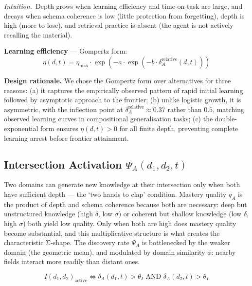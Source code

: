 \documentclass[10pt]{article}
\begin{document}
\noindent\textit{Intuition.}\ Depth grows when
learning efficiency and time-on-task are large, and decays when schema
coherence is low (little protection from forgetting), depth is high
(more to lose), and retrieval practice is absent (the agent is not
actively recalling the material).

\textbf{Learning efficiency} --- Gompertz form:
\begin{equation}\label{eq:gompertz}
\eta(d,t) = \eta_{\text{max}} \cdot \exp(-a \cdot \exp(-b \cdot \delta_A^{\text{relative}}(d,t)))
\end{equation}

\textbf{Design rationale.} We chose the Gompertz form over alternatives
for three reasons: (a) it captures the empirically observed pattern of
rapid initial learning followed by asymptotic approach to the frontier;
(b) unlike logistic growth, it is asymmetric, with the inflection point
at $\delta_A^{\text{relative}} \approx 0.37$ rather than $0.5$, matching
observed learning curves in compositional generalisation tasks; (c) the
double-exponential form ensures $\eta(d,t) > 0$ for all finite depth,
preventing complete learning arrest before frontier attainment.

\subsection{Intersection Activation \texorpdfstring{$\Psi_A(d_1,d_2,t)$}{Psi\_A(d\_1,d\_2,t)}}\label{sec:intersection}

Two domains can generate new knowledge at their intersection only when both have sufficient depth --- the `two hands to clap' condition. Mastery quality $q_A$ is the product of depth and schema coherence because both are necessary: deep but unstructured knowledge (high $\delta$, low $\sigma$) or coherent but shallow knowledge (low $\delta$, high $\sigma$) both yield low quality. Only when both are high does mastery quality become substantial, and this multiplicative structure is what creates the characteristic Σ-shape. The discovery rate $\Psi_A$ is bottlenecked by the weaker domain (the geometric mean), and modulated by domain similarity $\phi$: nearby fields interact more readily than distant ones.

\begin{equation}\label{eq:activation-condition}
I(d_1,d_2)_{\text{active}} \iff \delta_A(d_1,t) > \theta_I \text{ AND } \delta_A(d_2,t) > \theta_I
\end{equation}
\end{document}
